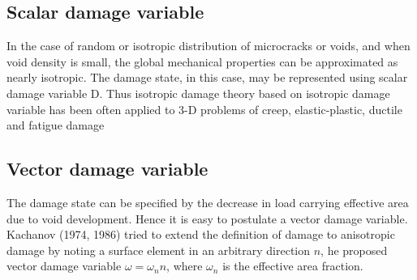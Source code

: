 \documentclass[12pt,twoside]{report}
\begin{document}
\subsection{Scalar damage variable}
\indent\indent\indent In the case of random or isotropic distribution of microcracks or voids, and when void density is small, the global mechanical properties can be approximated as nearly isotropic. The damage state, in this case, may be represented using scalar damage variable D. Thus isotropic damage theory based on isotropic damage variable has been often applied to 3-D problems of creep, elastic-plastic, ductile and fatigue damage
\subsection{Vector damage variable}
\indent\indent\indent The damage state can be specified by the decrease in load carrying effective area due to void development. Hence it is easy to postulate a vector damage variable. Kachanov (1974, 1986) tried to extend the definition of damage to anisotropic damage by noting a surface element in an arbitrary direction $n$, he proposed vector damage variable $ \omega = \omega_{n}n$, where $\omega_{n}$ is the effective area fraction. 
\end{document}

